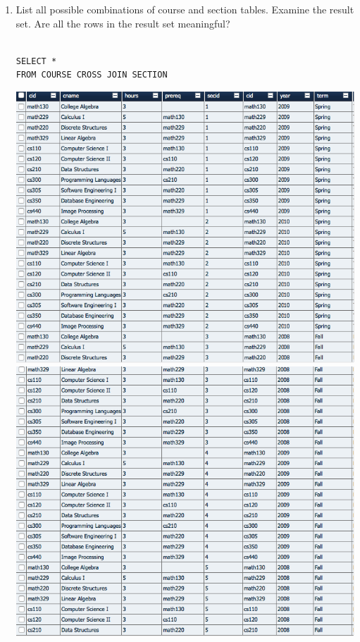 \documentclass[11pt]{article}
\begin{document}
\begin{enumerate}
\item List all possible combinations of course and section tables. Examine the result set. Are all the rows in the result set meaningful?

\begin{verbatim}

SELECT *
FROM COURSE CROSS JOIN SECTION

\end{verbatim}

\includegraphics[scale=0.5]{31a.png}\\
\includegraphics[scale=0.5]{31b.png}\\

\end{enumerate}
\end{document}
